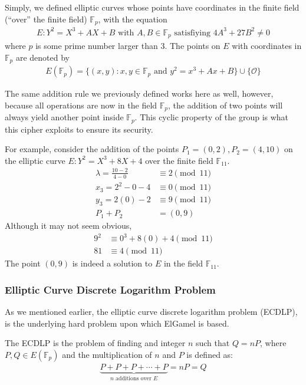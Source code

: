 \documentclass[12pt, a4paper, final]{report}
\begin{document}
Simply, we defined elliptic curves whose points have coordinates
in the finite field (``over'' the finite field) $\mathds{F}_p$, with
the equation
\begin{align*}
    E:Y^2 = X^3 + AX + B \text{ with } A, B \in \mathds{F}_p \text{ satisfiying }
    4A^3 + 27B^2 \neq 0
\end{align*}
where $p$ is some prime number larger than 3. The points on $E$ with
coordinates in $\mathds{F}_p$ are denoted by
\begin{align*}
    E(\mathds{F}_p) = \{ (x, y): x, y \in \mathds{F}_p \text{ and } y^2 = x^3 + Ax + B \} \cup \{ \mathcal{O} \}
\end{align*}

The same addition rule we previously defined works here as well, however,
because all operations are now in the field $\mathds{F}_p$, the addition
of two points will always yield another point inside $\mathds{F}_p$. This
cyclic property of the group is what this cipher exploits to ensure its
security.

For example, consider the addition of the points $P_1 = (0, 2), P_2 = (4, 10)$ on
the elliptic curve $E:Y^2 = X^3 + 8X + 4$ over the finite field $\mathds{F}_{11}$.
\begin{align*}
    \lambda = \frac{10 - 2}{4 - 0} &\equiv 2 \pmod{11}\\
    x_3 = 2^2 - 0 - 4 &\equiv 0 \pmod{11}\\
    y_3 = 2(0) - 2 &\equiv 9 \pmod{11}\\
    P_1 + P_2 &= (0, 9)
\end{align*}
Although it may not seem obvious,
\begin{align*}
    9^2 &\equiv 0^3 + 8(0) + 4 \pmod{11}\\
    81 &\equiv 4 \pmod{11}
\end{align*}
The point $(0, 9)$ is indeed a solution to $E$ in the field $\mathds{F}_{11}$.

\subsubsection{Elliptic Curve Discrete Logarithm Problem}

As we mentioned earlier, the elliptic curve discrete logarithm problem (ECDLP),
is the underlying hard problem upon which ElGamel is based.

The ECDLP is the problem of finding and integer $n$ such that
$Q = nP$, where $P, Q \in E(\mathds{F}_p)$ and the multiplication of $n$ and
$P$ is defined as:
\begin{align*}
    \underbrace{P + P + P + \cdots + P}_{\text{$n$ additions over $E$}} = nP = Q
\end{align*}
\end{document}
